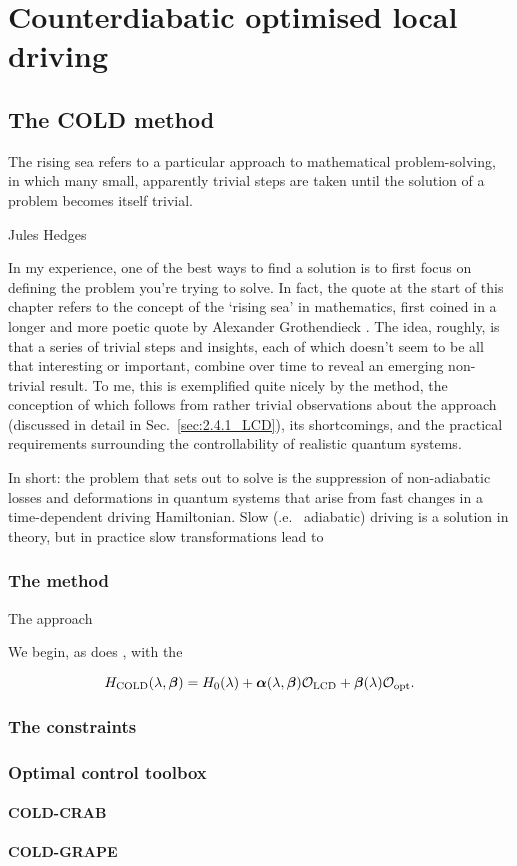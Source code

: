 \part{Counterdiabatic optimised local driving}

\chapter{The COLD method}\label{chap:4_COLD}

\epigraph{The rising sea refers to a particular approach to mathematical problem-solving, in which many small, apparently trivial steps are taken until the solution of a problem becomes itself trivial.}{Jules Hedges \cite{jules_hedges_rising_2018}}

In my experience, one of the best ways to find a solution is to first focus on defining the problem you're trying to solve. In fact, the quote at the start of this chapter refers to the concept of the `rising sea' in mathematics, first coined in a longer and more poetic quote by Alexander Grothendieck \cite{mclarty_grothendieck_nodate}. The idea, roughly, is that a series of trivial steps and insights, each of which doesn't seem to be all that interesting or important, combine over time to reveal an emerging non-trivial result. To me, this is exemplified quite nicely by the  method, the conception of which follows from rather trivial observations about the  approach (discussed in detail in Sec.~\ref{sec:2.4.1_LCD}), its shortcomings, and the practical requirements surrounding the controllability of realistic quantum systems. 

In short: the problem that  sets out to solve is the suppression of non-adiabatic losses and deformations in quantum systems that arise from fast changes in a time-dependent driving Hamiltonian. Slow (\@i.e.~ adiabatic) driving is a solution in theory, but in practice slow transformations lead to 

\section{The method}

The  approach 

We begin, as does , with the 

\begin{equation}\label{eq:expandedH}
H_{\rm COLD}(\lambda,\boldsymbol{\beta}) = H_0(\lambda) + {\boldsymbol \alpha}(\lambda,\boldsymbol{\beta}) \mathcal{O}_{\rm LCD} + \boldsymbol{\beta}(\lambda) \mathcal{O}_{\rm opt}.
\end{equation}

\section{The constraints}

\section{Optimal control toolbox}

\subsection{COLD-CRAB}

\subsection{COLD-GRAPE}